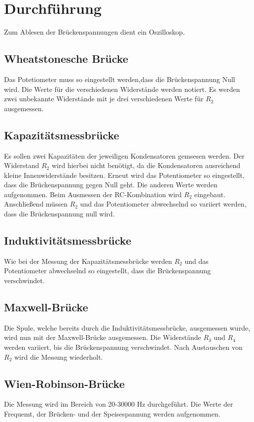 \section{Durchführung}
\label{sec:Durchführung}

Zum Ablesen der Brückenspannungen dient ein Oszilloskop.

\subsection{Wheatstonesche Brücke}
Das Potetiometer muss so eingestellt werden,dass die Brückenspannung Null wird. Die Werte für die verschiedenen Widerstände werden notiert. Es werden zwei unbekannte Widerstände mit je drei verschiedenen Werte für $R_{2}$ ausgemessen.

\subsection{Kapazitätsmessbrücke}
Es sollen zwei Kapazitäten der jeweiligen Kondensatoren gemsesen werden.
Der Widerstand $R_{2}$ wird hierbei nicht benötigt, da die Kondensatoren ausreichend kleine Innenwiderstände besitzen. Erneut wird das Potentiometer so eingestellt, dass die Brückenspannung gegen Null geht. Die anderen Werte werden aufgenommen.
Beim Ausmessen der RC-Kombination wird $R_{2}$ eingebaut. Anschließend müssen $R_{2}$ und das Potentiometer abwechselnd so variiert werden, dass die Brückenspannung null wird.

\subsection{Induktivitätsmessbrücke}
Wie bei der Messung der Kapazitätsmessbrücke werden $R_{2}$ und das Potentiometer abwechselnd so eingestellt, dass die Brückenspannung verschwindet.

\subsection{Maxwell-Brücke}
Die Spule, welche bereits durch die Induktivitätsmessbrücke, ausgemessen wurde, wird nun mit der Maxwell-Brücke ausgemessen. Die Widerstände $R_3$ und $R_4$ werden variiert, bis die Brückenspannung verschwindet. Nach Austauschen von $R_{2}$ wird die Messung wiederholt.

\subsection{Wien-Robinson-Brücke}
Die Messung wird im Bereich von 20-30000 \si{\Hz} durchgeführt. Die Werte der Frequemt, der Brücken- und der Speisespannung werden aufgenommen.
